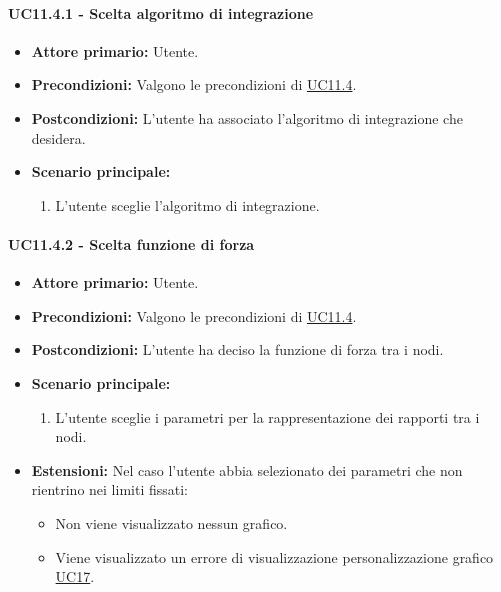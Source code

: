 \paragraph{UC11.4.1 - Scelta algoritmo di integrazione}
\label{sec:UC11.4.1}
    \begin{itemize}
        \item \textbf{Attore primario:} Utente.
        \item \textbf{Precondizioni:} Valgono le precondizioni di \hyperref[sec:UC11.4]{UC11.4}.
	    \item \textbf{Postcondizioni:} L'utente ha associato l'algoritmo di integrazione che desidera.
	    \item \textbf{Scenario principale:} 
	    \begin{enumerate}
	    		\item L'utente sceglie l'algoritmo di integrazione.
		\end{enumerate}
    \end{itemize}
    
\paragraph{UC11.4.2 - Scelta funzione di forza}
\label{sec:UC11.4.2}
    \begin{itemize}
        \item \textbf{Attore primario:} Utente.
        \item \textbf{Precondizioni:} Valgono le precondizioni di \hyperref[sec:UC11.4]{UC11.4}.
	    \item \textbf{Postcondizioni:} L'utente ha deciso la funzione di forza tra i nodi.
	    \item \textbf{Scenario principale:} 
	    \begin{enumerate}
	    		\item L'utente sceglie i parametri per la rappresentazione dei rapporti tra i nodi.
		\end{enumerate}
	    \item \textbf{Estensioni:} Nel caso l'utente abbia selezionato dei parametri che non rientrino nei limiti fissati:
              \begin{itemize}
                  \item Non viene visualizzato nessun grafico.
                  \item Viene visualizzato un errore di visualizzazione personalizzazione grafico \hyperref[sec:UC17 - Errore di personalizzazione]{UC17}.
              \end{itemize}
    \end{itemize}

